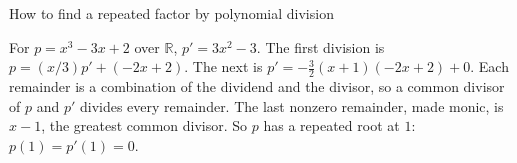 \begin{methodbox}{How to find a repeated factor by polynomial division}
\begin{enumerate}[label=\arabic*.,leftmargin=1.5em,itemsep=2pt,topsep=2pt]
\ii For $p=x^3-3x+2$ over $\mathbb R$, $p'=3x^2-3$. The first division is $p=(x/3)p'+(-2x+2)$.
\ii The next is $p'=-\tfrac32(x+1)(-2x+2)+0$. Each remainder is a combination of the dividend and the divisor, so a common divisor of $p$ and $p'$ divides every remainder. The last nonzero remainder, made monic, is $x-1$, the greatest common divisor. So $p$ has a repeated root at $1$: $p(1)=p'(1)=0$.
\end{enumerate}
\end{methodbox}
